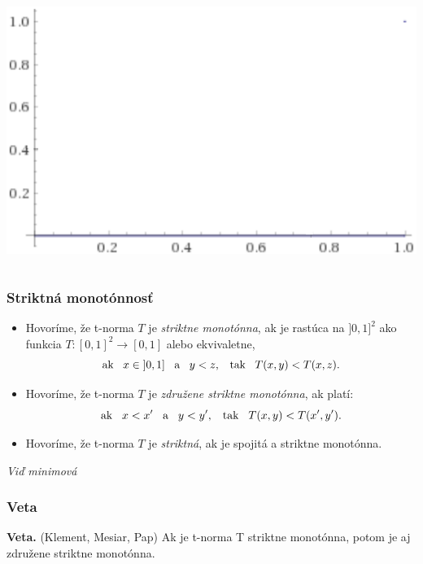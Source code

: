 \documentclass{beamer}
\begin{document}
\begin{frame}
\begin{columns}
\begin{minipage}[c][0.4\textheight][c]{\linewidth}
\end{minipage}
\begin{minipage}[c][0.4\textheight][c]{\linewidth}
  \centering
  \includegraphics[width=0.8\linewidth]{drastDiag}
\end{minipage}
\end{columns}
\end{frame}

\begin{frame}
\frametitle{Striktná monotónnosť}
\begin{itemize}
\item  Hovoríme, že t-norma $T$ je {\em striktne
monotónna}, ak
je rastúca na $]0,1]^2$ ako funkcia $ T:[0,1]^2 \rightarrow [0,1]$ alebo
ekvivaletne,
$$ \text {ak} \hskip 3mm x \in \hskip 1mm ]0,1] \hskip 3mm \text{a} \hskip 3mm y < z, \hskip 3mm \text {tak} \hskip 3mm T(x,y) < T(x,z). $$
\item  Hovoríme, že t-norma $T$ je {\em združene striktne
monotónna}, ak platí:
$$ \text{ak} \hskip 3mm  x < x'\hskip 3mm \text{a} \hskip 3mm y<y',
\hskip 3mm  \text{tak} \hskip 3mm   T(x,y)<T(x',y').$$
\item  Hovoríme, že t-norma $T$ je {\em striktná}, ak je spojitá a striktne monotónna.
\end{itemize}
\begin{small}\textit{Viď minimová}\end{small}
\end{frame}

\begin{frame}
\frametitle{Veta}
{\bf Veta.} (Klement, Mesiar, Pap)
Ak je t-norma T striktne monotónna, potom je aj združene striktne monotónna.
\end{frame}
\end{document}

